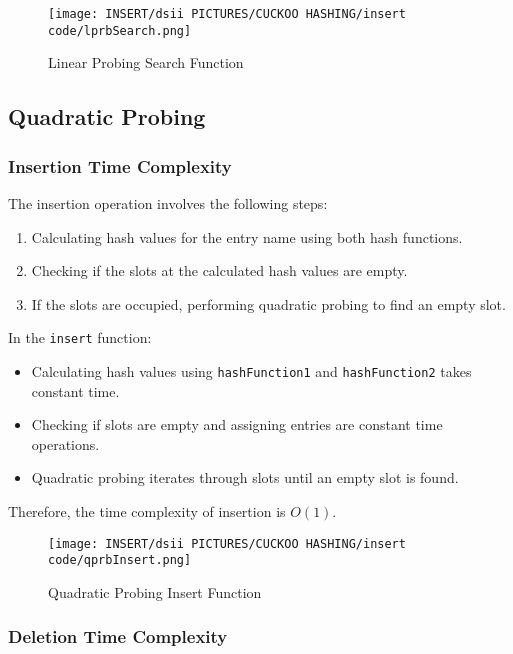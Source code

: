 \documentclass[12pt]{article}
\begin{document}
\begin{figure}[htbp]
    \centering
    \texttt{[image: INSERT/dsii PICTURES/CUCKOO HASHING/insert code/lprbSearch.png]}
    \caption{Linear Probing Search Function}
    \label{fig:linear_search}
\end{figure}

\newpage

\subsection{Quadratic Probing}

\subsubsection{Insertion Time Complexity}

The insertion operation involves the following steps:
\begin{enumerate}
    \item Calculating hash values for the entry name using both hash functions.
    \item Checking if the slots at the calculated hash values are empty.
    \item If the slots are occupied, performing quadratic probing to find an empty slot.
\end{enumerate}

In the \texttt{insert} function:
\begin{itemize}
    \item Calculating hash values using \texttt{hashFunction1} and \texttt{hashFunction2} takes constant time.
    \item Checking if slots are empty and assigning entries are constant time operations.
    \item Quadratic probing iterates through slots until an empty slot is found.
\end{itemize}

Therefore, the time complexity of insertion is $O(1)$.

\begin{figure}[htbp]
    \centering
    \texttt{[image: INSERT/dsii PICTURES/CUCKOO HASHING/insert code/qprbInsert.png]}
    \caption{Quadratic Probing Insert Function}
    \label{fig:quadratic_insertion}
\end{figure}

\newpage

\subsubsection{Deletion Time Complexity}
\end{document}
